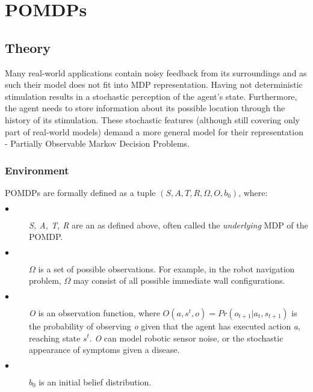 \newcommand{\norm}[1]{\left\lVert#1\right\rVert}


\part{POMDPs}

\chapter{Theory}

Many real-world applications contain noisy feedback from its surroundings and as such their model does not fit into MDP representation. Having not deterministic stimulation results in a stochastic perception of the agent's state. Furthermore, the agent needs to store information about its possible location through the history of its stimulation. These stochastic features (although still covering only part of real-world models) demand a more general model for their representation - Partially Observable Markov Decision Problems. 

\section{Environment}
\begin{definition}\label{def:POMDP}
POMDPs \cite{Shani2013} are formally defined as a tuple $(S, A, T, R, \Omega, O, b_0)$, where:
\begin{description}
  \item[$\bullet$ ] \textit{S, A, T, R} are an \label{MDP} as defined above, often called the \textit{underlying} MDP of the POMDP.
  \item[$\bullet$ ] $\Omega$ is a set of possible observations. For example, in the robot navigation problem, $\Omega$ may
consist of all possible immediate wall configurations.
  \item[$\bullet$ ] \textit{O} is an observation function, where $O(a,s^t, o) = Pr(o_{t+1}|a_t,s_{t+1})$ is the probability of
observing \textit{o} given that the agent has executed action \textit{a}, reaching state \textit{$s^t$}. \textit{O} can model
robotic sensor noise, or the stochastic appearance of symptoms given a disease.
  \item[$\bullet$ ] $b_0$ is an initial belief distribution.
\end{description}

\end{definition}

